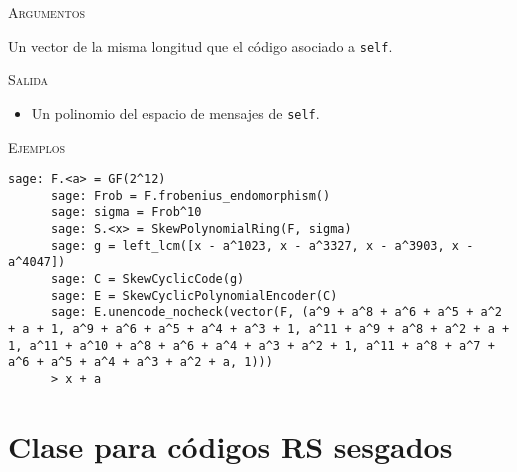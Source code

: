 \begin{description}[leftmargin=1em, font=\normalfont\ttfamily, style=nextline]
\begin{description}[font=\ttfamily, style=nextline]
    \textsc{Argumentos}
    \begin{description}[font=\normalfont\ttfamily]
      \item[c] Un vector de la misma longitud que el código asociado a \texttt{self}.
    \end{description}

    \textsc{Salida}
    \begin{itemize}
      \item Un polinomio del espacio de mensajes de \texttt{self}.
    \end{itemize}
    
    \textsc{Ejemplos}
    \begin{lstlisting}[gobble=6]
      sage: F.<a> = GF(2^12)
      sage: Frob = F.frobenius_endomorphism()
      sage: sigma = Frob^10
      sage: S.<x> = SkewPolynomialRing(F, sigma)
      sage: g = left_lcm([x - a^1023, x - a^3327, x - a^3903, x - a^4047])
      sage: C = SkewCyclicCode(g)
      sage: E = SkewCyclicPolynomialEncoder(C)
      sage: E.unencode_nocheck(vector(F, (a^9 + a^8 + a^6 + a^5 + a^2 + a + 1, a^9 + a^6 + a^5 + a^4 + a^3 + 1, a^11 + a^9 + a^8 + a^2 + a + 1, a^11 + a^10 + a^8 + a^6 + a^4 + a^3 + a^2 + 1, a^11 + a^8 + a^7 + a^6 + a^5 + a^4 + a^3 + a^2 + a, 1)))
      > x + a
    \end{lstlisting}
  \end{description}
\end{description}


\section{Clase para códigos RS sesgados}

